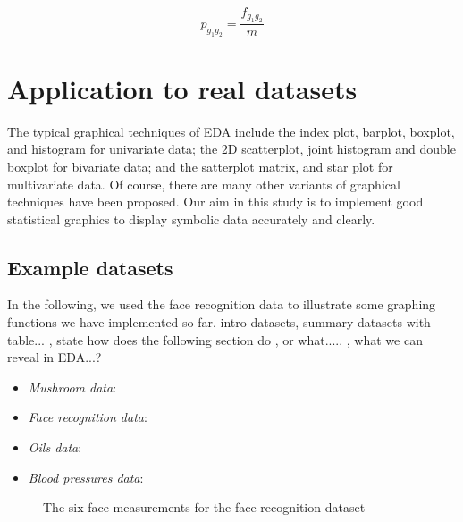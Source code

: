 \documentclass[article]{jss}
\begin{document}
\begin{equation}\label{eq:bi_rel_fg}
p_{g_1g_2} = \frac{f_{g_1g_2}}{m}
\end{equation}



\section{Application to real datasets}

The typical graphical techniques of EDA include the index plot, barplot, boxplot, and histogram for univariate data; the 2D scatterplot, joint
histogram and double boxplot for bivariate data; and the satterplot matrix, and star plot for multivariate data. Of course, there are many other variants of graphical techniques have been proposed. Our aim in this study is to implement good statistical graphics to display symbolic data accurately and clearly. 

\subsection{Example datasets}

In the following, we used the face recognition data to illustrate some graphing functions we have implemented so far.
intro datasets, summary datasets with table... , state how does the following section do , or what..... , what we can reveal in EDA...?

\begin{itemize}
  \item \emph{Mushroom data}: 
  \item \emph{Face recognition data}: 
  \item \emph{Oils data}: 
  \item \emph{Blood pressures data}: 
\end{itemize}



\begin{figure}[htbp]
\centering
{}
\caption{\label{fig:face} The six face measurements for the face recognition dataset}
\end{figure}
\end{document}
